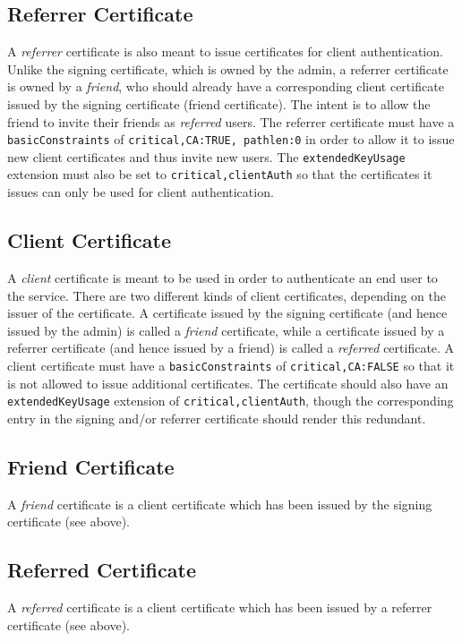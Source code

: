 \documentclass{article}
\begin{document}
\subsection{Referrer Certificate}
A \emph{referrer} certificate is also meant to issue certificates for client authentication.  Unlike the signing certificate, which is owned by the admin, a referrer certificate is owned by a \emph{friend}, who should already have a corresponding client certificate issued by the signing certificate (friend certificate).  The intent is to allow the friend to invite their friends as \emph{referred} users.  The referrer certificate must have a \texttt{basicConstraints} of \texttt{critical,CA:TRUE, pathlen:0} in order to allow it to issue new client certificates and thus invite new users.  The \texttt{extendedKeyUsage} extension must also be set to \texttt{critical,clientAuth} so that the certificates it issues can only be used for client authentication.

\subsection{Client Certificate}
A \emph{client} certificate is meant to be used in order to authenticate an end user to the service.  There are two different kinds of client certificates, depending on the issuer of the certificate.  A certificate issued by the signing certificate (and hence issued by the admin) is called a \emph{friend} certificate, while a certificate issued by a referrer certificate (and hence issued by a friend) is called a \emph{referred} certificate.  A client certificate must have a \texttt{basicConstraints} of \texttt{critical,CA:FALSE} so that it is not allowed to issue additional certificates.  The certificate should also have an \texttt{extendedKeyUsage} extension of \texttt{critical,clientAuth}, though the corresponding entry in the signing and/or referrer certificate should render this redundant.

\subsection{Friend Certificate}
A \emph{friend} certificate is a client certificate which has been issued by the signing certificate (see above).

\subsection{Referred Certificate}
A \emph{referred} certificate is a client certificate which has been issued by a referrer certificate (see above).
\end{document}
